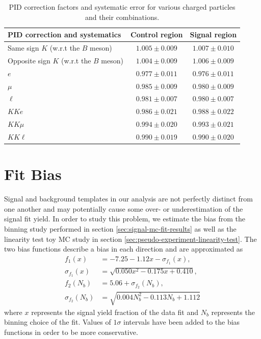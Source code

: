 \begin{table}[H]
	\centering
	\begin{tabular}{|l|c|c|}
		\hline
		PID correction and systematics & Control region & Signal region \\
		\hline
		Same sign $K$ (w.r.t the $B$ meson) & $1.005\pm 0.009$ & $1.007\pm 0.010$\\
		\hline
		Opposite sign $K$ (w.r.t the $B$ meson) & $1.004\pm 0.009$ & $1.006\pm 0.009$\\
		\hline
		$e$ & $0.977\pm 0.011$ & $0.976\pm 0.011$\\
		\hline
		$\mu$ & $0.985\pm 0.009$ & $0.980\pm 0.009$\\
		\hline
		$\ell$ & $0.981\pm 0.007$ & $0.980\pm 0.007$\\
		\hline
		\hline
		$KKe$ & $0.986 \pm 0.021$ & $0.988\pm 0.022$\\
		\hline
		$KK\mu$ & $0.994 \pm 0.020$ & $0.993\pm 0.021$\\
		\hline
		$KK\ell$ & $0.990 \pm 0.019$ & $0.990\pm 0.020$\\
		\hline
	\end{tabular}
	\caption{PID correction factors and systematic error for various charged particles and their combinations.}
	\label{tab:PID}
\end{table}

\section{Fit Bias}
Signal and background templates in our analysis are not perfectly distinct from one another and may potentially cause some over- or underestimation of the signal fit yield. In order to study this problem, we estimate the bias from the binning study performed in section \ref{sec:signal-mc-fit-results} as well as the linearity test toy MC study in section \ref{sec:pseudo-experiment-linearity-test}. The two bias functions describe a bias in each direction and are approximated as
\begin{align}
f_1(x) &= -7.25-1.12x - \sigma_{f_1}(x), \\
\sigma_{f_1}(x) &= \sqrt{0.050 x^2 - 0.175 x + 0.410}, \\
f_2(N_b) &= 5.06 + \sigma_{f_2}(N_b), \\
\sigma_{f_2}(N_b) &= \sqrt{0.004N_b^2 - 0.113 N_b + 1.112}
\end{align}
where $x$ represents the signal yield fraction of the data fit and $N_b$ represents the binning choice of the fit. Values of $1\sigma$ intervals have been added to the bias functions in order to be more conservative.

